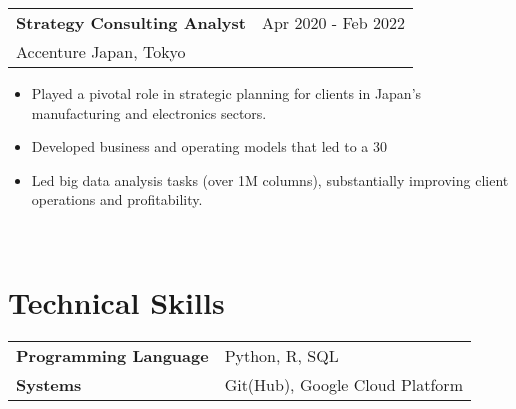 \documentclass[11pt, a4paper]{article}
\begin{document}
\newpage
\begin{tabular}{@{}p{}p{}}
\textbf{Strategy Consulting Analyst} & \hfill Apr 2020 - Feb 2022 \\
Accenture Japan, Tokyo \\
\end{tabular}
\begin{itemize}[noitemsep, topsep=0pt] %
    \item Played a pivotal role in strategic planning for clients in Japan's manufacturing and electronics sectors.
    \item Developed business and operating models that led to a 30%
    \item Led big data analysis tasks (over 1M columns), substantially improving client operations and profitability.
\end{itemize} \\

\section*{Technical Skills}
\begin{tabular}{@{}p{}p{}}
\textbf{Programming Language} & Python, R, SQL \\
\textbf{Systems} & Git(Hub), Google Cloud Platform \\
\end{tabular}
\end{document}
